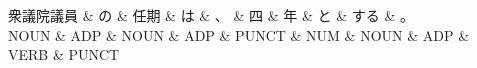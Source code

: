 \documentclass[tikz,border=5pt]{standalone}
\begin{document}
\normalsize
\begin{dependency}[edge unit distance=12.0pt]
    \begin{deptext}[column sep=1em]
        衆議院議員 \& の \& 任期 \& は \& 、 \& 四 \& 年 \& と \& する \& 。\\
        NOUN \& ADP \& NOUN \& ADP \& PUNCT \& NUM \& NOUN \& ADP \& VERB \& PUNCT\\
    \end{deptext}
\end{dependency}
\end{document}
